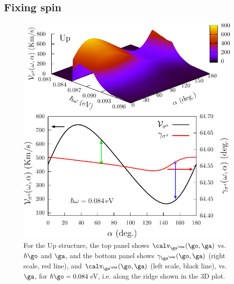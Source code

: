 \documentclass[prb,11pt,tightenlines,twocolumn,aps]{revtex4-1}
\begin{document}
\subsection{Fixing spin} %
\label{sec:res-fixspin}

\begin{figure}[t]
\centering
\includegraphics[width=\linewidth]{upplots/up-vsz-w1}
\caption{For the Up structure, the top panel shows 
$\calv_{\gs^\rmz}(\go,\ga)$ vs. $\hbar\go$ and $\ga$, and the bottom panel
shows $\gamma_{\gs^\rmz}(\go,\ga)$ (right scale, red line), and
$\calv_{\gs^\rmz}(\go,\ga)$ (left scale, black line), vs. $\ga$, for
$\hbar\go=0.084$\,eV, i.e. along the ridge shown in the 3D plot. }
\label{fig:up-vsz-w1}
\end{figure}
\end{document}
